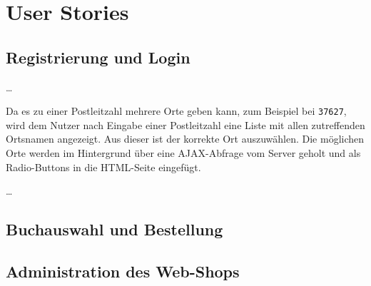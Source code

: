\section{User Stories}
	\subsection{Registrierung und Login}
	\dots
	
	Da es zu einer Postleitzahl mehrere Orte geben kann, zum Beispiel bei \lstinline|37627|, wird dem Nutzer nach Eingabe einer Postleitzahl eine Liste mit allen zutreffenden Ortsnamen angezeigt. Aus dieser ist der korrekte Ort auszuwählen. Die möglichen Orte werden im Hintergrund über eine AJAX-Abfrage vom Server geholt und als Radio-Buttons in die HTML-Seite eingefügt.
	
	\dots
	
	\subsection{Buchauswahl und Bestellung}
	
	\subsection{Administration des Web-Shops}